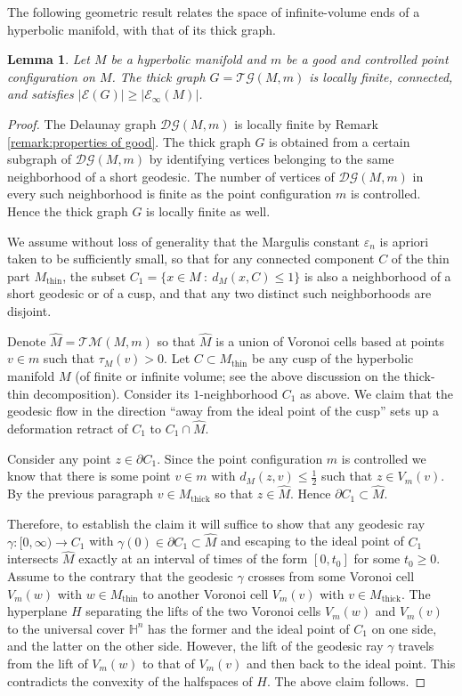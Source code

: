 \documentclass{amsart}
\newcommand{\HH}{\mathbb{H}}
\newcommand{\DelanGraph}{\mathcal{DG}}
\newcommand{\ThickGraph}{\mathcal{TG}}
\newcommand{\ThickManifold}[2]{\mathcal{TM}(#1,#2)}
\newcommand{\Ends}[1]{\mathcal{E}\left(#1\right)}
\newcommand{\EndsInf}[1]{\mathcal{E}_{\infty}\left(#1\right)}
\theoremstyle{plain}
\newtheorem{lemma}[theorem]{Lemma}
\numberwithin{equation}{section}
\theoremstyle{definition}
\begin{document}
The following geometric result relates the space of infinite-volume ends of a hyperbolic manifold, with that of its thick graph.

\begin{lemma}
\label{lemma:properties of thick graph}
Let $M$ be a hyperbolic manifold and $m$ be a good and controlled point configuration on $M$. The thick graph $G = \ThickGraph(M,m)$  is locally finite, connected, and satisfies $|\Ends{G}| \ge |\EndsInf{M}|$.
\end{lemma}

\begin{proof}
The Delaunay graph $\DelanGraph(M,m)$ is locally finite by Remark \ref{remark:properties of good}. The thick graph $G$ is obtained from  a certain subgraph of $\DelanGraph(M,m)$ by identifying  vertices belonging to the same neighborhood of a short geodesic. The number of vertices of $\DelanGraph(M,m)$ in every such neighborhood is finite as the point configuration $m$ is controlled. Hence the thick graph $G$ is locally finite as well. 

We assume without loss of generality that the Margulis constant $\varepsilon_n$ is apriori taken to be sufficiently small, so that for any connected component $C$ of the thin part $M_\text{thin}$, the subset 
 $C_1 = \{x \in M \: : \: d_M(x,C) \le 1\}$ is also a neighborhood of a short geodesic or of a cusp, and that any two distinct such neighborhoods are disjoint.

Denote $\widehat M = \ThickManifold{M}{m}$ so that $\widehat M$ is a union of Voronoi cells based at points $v\in m$ such that $\tau_M(v)>0$. 
Let $C \subset M_\mathrm{thin}$ be any cusp of the hyperbolic manifold $M$  (of finite or infinite volume; see the above discussion on the thick-thin decomposition). 
Consider its $1$-neighborhood $C_1$ as above. 
We claim that the geodesic flow in the direction \enquote{away from the ideal point of the cusp} sets up a deformation retract of $C_1$ to $C_1\cap \widehat M$. 

Consider any point $z \in \partial C_1$. Since the point configuration $m$ is controlled we know that there is some point $v \in m$ with $d_M(z,v) \le \frac{1}{2}$ such that $z \in V_m(v)$. By the previous paragraph $v \in M_\text{thick}$ so that $z \in \widehat M$. Hence $\partial C_1 \subset \widehat M$.

Therefore, to establish the claim it will suffice to show that any geodesic ray $\gamma:[0,\infty)\to C_1$ with  $\gamma(0)\in \partial C_1 \subset \widehat M$ and escaping to the ideal point of $C_1$ intersects $\widehat M$ exactly at an interval of times of the form $\left[0,t_0\right]$ for some $t_0 \ge 0$. 
Assume to the contrary that the geodesic $\gamma$ crosses from some Voronoi cell $V_m(w)$ with $w\in M_\text{thin}$ to another Voronoi cell $V_m(v)$ with $v\in M_\text{thick}$.
The hyperplane $H$ separating the lifts of the two Voronoi cells $V_m(w)$ and $V_m(v)$ to the universal cover $\HH^n$ has the former and the ideal point of $C_1$ on one side, and the latter on the other side. However, the lift of the geodesic ray $\gamma$ travels from the lift of $V_m(w)$ to that of $V_m(v)$ and then back to the ideal point. This contradicts the convexity of the halfspaces of $H$. The above claim follows.


\end{proof}
\end{document}
